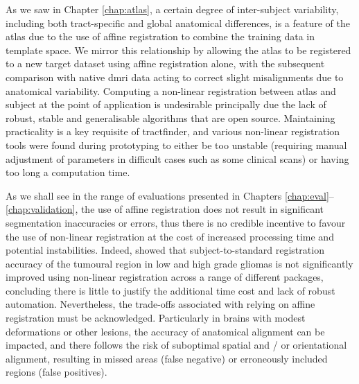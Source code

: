 As we saw in Chapter \ref{chap:atlas}, a certain degree of inter-subject variability, including both tract-specific and global anatomical differences, is a feature of the atlas due to the use of affine registration to combine the training data in template space.
We mirror this relationship by allowing the atlas to be registered to a new target dataset using affine registration alone, with the subsequent comparison with native \gls{dmri} data acting to correct slight misalignments due to anatomical variability.
Computing a non-linear registration between atlas and subject at the point of application is undesirable principally due the lack of robust, stable and generalisable algorithms that are open source.
Maintaining practicality is a key requisite of tractfinder, and various non-linear registration tools were found during prototyping to either be too unstable (requiring manual adjustment of parameters in difficult cases such as some clinical scans) or having too long a computation time.\autocite{Visser2020}

As we shall see in the range of evaluations presented in Chapters \ref{chap:eval}--\ref{chap:validation}, the use of affine registration does not result in significant segmentation inaccuracies or errors, thus there is no credible incentive to favour the use of non-linear registration at the cost of increased processing time and potential instabilities.
Indeed, \textcite{Visser2020} showed that subject-to-standard registration accuracy of the tumoural region in low and high grade gliomas is not significantly improved using non-linear registration across a range of different packages, concluding there is little to justify the additional time cost and lack of robust automation.
Nevertheless, the trade-offs associated with relying on affine registration must be acknowledged.
Particularly in brains with modest deformations or other lesions, the accuracy of anatomical alignment can be impacted, and there follows the risk of suboptimal spatial and / or orientational alignment, resulting in missed areas (false negative) or erroneously included regions (false positives).

